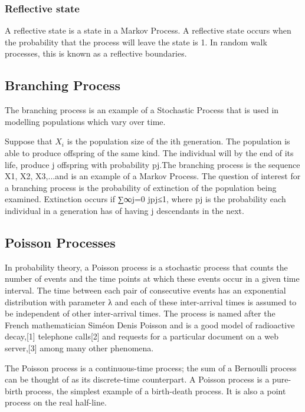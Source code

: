 \subsubsection*{Reflective state}

A reflective state is a state in a Markov Process. A reflective state occurs when the probability that the process will leave the state is 1. In random walk processes, this is known as a reflective boundaries.

\subsection*{Branching Process}

The branching process is an example of a Stochastic Process that is used in modelling populations which vary over time. 

Suppose that $X_i$ is the population size of the ith generation. The population is able to produce offspring of the same kind. The individual will by the end of its life, produce j offspring with probability pj.The branching process is the sequence X1, X2, X3,...and is an example of a Markov Process. The question of interest for a branching process is the probability of extinction of the population being examined. Extinction occurs if ∑∞j=0 jpj≤1, where pj is the probability each individual in a generation has of having j descendants in the next.

\subsection*{Poisson Processes}
In probability theory, a Poisson process is a stochastic process that counts the number of events and the time points at which these events occur in a given time interval. The time between each pair of consecutive events has an exponential distribution with parameter λ and each of these inter-arrival times is assumed to be independent of other inter-arrival times. The process is named after the French mathematician Siméon Denis Poisson and is a good model of radioactive decay,[1] telephone calls[2] and requests for a particular document on a web server,[3] among many other phenomena.
 
The Poisson process is a continuous-time process; the sum of a Bernoulli process can be thought of as its discrete-time counterpart. A Poisson process is a pure-birth process, the simplest example of a birth-death process. It is also a point process on the real half-line.

